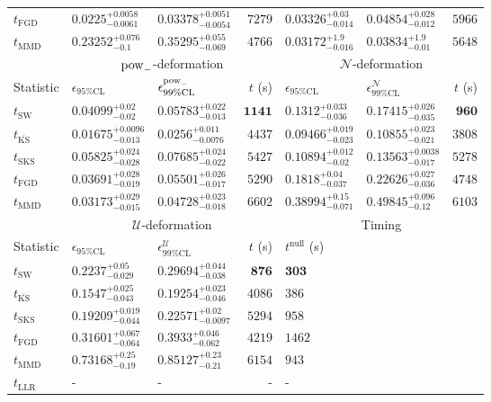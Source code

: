 \begin{tabular}{l|llr|llr}
	$t_{\mathrm{FGD}}$ & ${\mathbf{0.0225_{-0.0061}^{+0.0058}}}$ & ${\mathbf{0.03378_{-0.0054}^{+0.0051}}}$ & $7279$ & $0.03326_{-0.014}^{+0.03}$ & $0.04854_{-0.012}^{+0.028}$ & $5966$ \\
	$t_{\mathrm{MMD}}$ & $0.23252_{-0.1}^{+0.076}$ & $0.35295_{-0.069}^{+0.055}$ & $4766$ & $0.03172_{-0.016}^{+1.9}$ & $0.03834_{-0.01}^{+1.9}$ & $5648$ \\
	\toprule
	\multicolumn{1}{c}{} & \multicolumn{3}{c}{$\rm{pow}_{-}$-deformation} & \multicolumn{3}{c}{$\mathcal{N}$-deformation} \\
	Statistic & $\epsilon_{95\%\mathrm{CL}}$ & $\epsilon^  {\rm{pow}_{-}}_{99\%\mathrm{CL}}$ & $t$ (s) & $\epsilon_{95\%\mathrm{CL}}$ & $\epsilon^    {\mathcal{N}}_{99\%\mathrm{CL}}$ & $t$ (s) \\
	\midrule
	$t_{\mathrm{SW}}$ & $0.04099_{-0.02}^{+0.02}$ & $0.05783_{-0.013}^{+0.022}$ & ${\mathbf{1141}}$ & $0.1312_{-0.036}^{+0.033}$ & $0.17415_{-0.035}^{+0.026}$ & ${\mathbf{960}}$ \\
	$t_{\overline{\mathrm{KS}}}$ & ${\mathbf{0.01675_{-0.013}^{+0.0096}}}$ & ${\mathbf{0.0256_{-0.0076}^{+0.011}}}$ & $4437$ & ${\mathbf{0.09466_{-0.023}^{+0.019}}}$ & ${\mathbf{0.10855_{-0.021}^{+0.023}}}$ & $3808$ \\
	$t_{\mathrm{SKS}}$ & $0.05825_{-0.028}^{+0.024}$ & $0.07685_{-0.022}^{+0.024}$ & $5427$ & $0.10894_{-0.02}^{+0.012}$ & $0.13563_{-0.017}^{+0.0038}$ & $5278$ \\
	$t_{\mathrm{FGD}}$ & $0.03691_{-0.019}^{+0.028}$ & $0.05501_{-0.017}^{+0.026}$ & $5290$ & $0.1818_{-0.037}^{+0.04}$ & $0.22626_{-0.036}^{+0.027}$ & $4748$ \\
	$t_{\mathrm{MMD}}$ & $0.03173_{-0.015}^{+0.029}$ & $0.04728_{-0.018}^{+0.023}$ & $6602$ & $0.38994_{-0.071}^{+0.15}$ & $0.49845_{-0.12}^{+0.096}$ & $6103$ \\
	\toprule
	\multicolumn{1}{c}{} & \multicolumn{3}{c}{$\mathcal{U}$-deformation} & \multicolumn{3}{c}{Timing} \\
	Statistic & $\epsilon_{95\%\mathrm{CL}}$ & $\epsilon^    {\mathcal{U}}_{99\%\mathrm{CL}}$ & $t$ (s) & $t^{\mathrm{null}}$ (s) \\
	\midrule
	$t_{\mathrm{SW}}$ & $0.2237_{-0.029}^{+0.05}$ & $0.29694_{-0.038}^{+0.044}$ & ${\mathbf{876}}$ & ${\mathbf{303}}$ \\
	$t_{\overline{\mathrm{KS}}}$ & ${\mathbf{0.1547_{-0.043}^{+0.025}}}$ & ${\mathbf{0.19254_{-0.046}^{+0.023}}}$ & $4086$ & $386$ \\
	$t_{\mathrm{SKS}}$ & $0.19209_{-0.044}^{+0.019}$ & $0.22571_{-0.0097}^{+0.02}$ & $5294$ & $958$ \\
	$t_{\mathrm{FGD}}$ & $0.31601_{-0.064}^{+0.067}$ & $0.3933_{-0.062}^{+0.046}$ & $4219$ & $1462$ \\
	$t_{\mathrm{MMD}}$ & $0.73168_{-0.19}^{+0.25}$ & $0.85127_{-0.21}^{+0.23}$ & $6154$ & $943$ \\
	$t_{\mathrm{LLR}}$ & - & - & - & - \\
	\bottomrule
\end{tabular}
